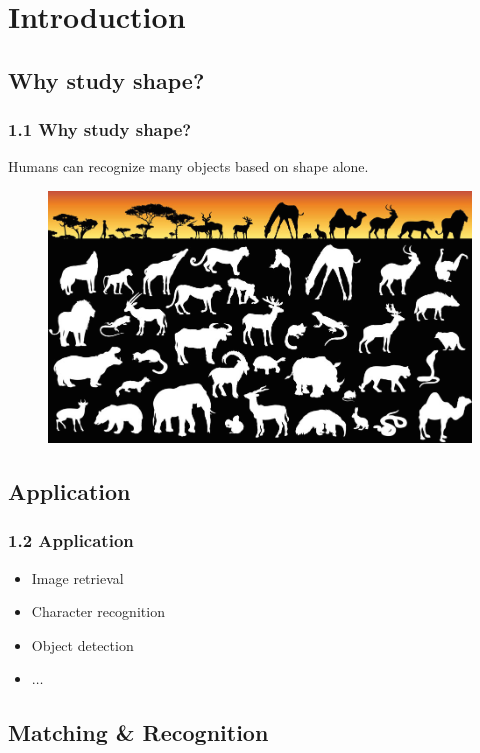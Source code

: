 \documentclass[notheorems,serif,table,compress]{beamer}  %
\begin{document}
\section{Introduction}


\subsection{Why study shape?}
\begin{frame}[fragile]
\frametitle{1.1 Why study shape?}
Humans can recognize many objects based on shape alone.
    \begin{figure}
        \includegraphics[width=1\linewidth]{jianying}
    \end{figure}
\end{frame}

 
\subsection{Application}

\begin{frame}
\frametitle{1.2 Application}
    \begin{itemize}
        \item Image retrieval
        \item Character recognition
        \item Object detection
        \item $\dots$
    \end{itemize}
\end{frame}

\subsection{Matching \& Recognition}
\end{document}
